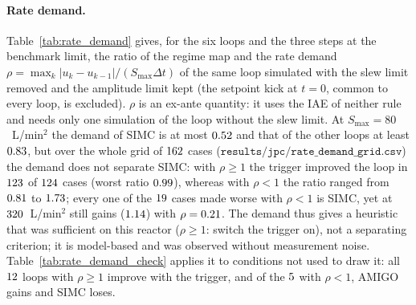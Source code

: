 \documentclass[11pt]{article}
\begin{document}




\paragraph{Rate demand.} Table~\ref{tab:rate_demand} gives, for the six loops and the three steps at the benchmark limit, the ratio of the regime map and the rate demand $\rho = \max_k|u_k - u_{k-1}|/(S_{\max}\Delta t)$ of the same loop simulated with the slew limit removed and the amplitude limit kept (the setpoint kick at $t = 0$, common to every loop, is excluded). $\rho$ is an ex-ante quantity: it uses the IAE of neither rule and needs only one simulation of the loop without the slew limit. At $S_{\max} = 80$~L/min$^2$ the demand of SIMC is at most $0.52$ and that of the other loops at least $0.83$, but over the whole grid of $162$ cases ($\texttt{results/jpc/rate\_demand\_grid.csv}$) the demand does not separate SIMC: with $\rho \ge 1$ the trigger improved the loop in $123$ of $124$ cases (worst ratio $0.99$), whereas with $\rho < 1$ the ratio ranged from $0.81$ to $1.73$; every one of the $19$ cases made worse with $\rho < 1$ is SIMC, yet \vrhohelplowloop{} at $320$~L/min$^2$ still gains ($1.14$) with $\rho = 0.21$. The demand thus gives a heuristic that was sufficient on this reactor ($\rho \ge 1$: switch the trigger on), not a separating criterion; it is model-based and was observed without measurement noise. Table~\ref{tab:rate_demand_check} applies it to conditions not used to draw it: all $12$ loops with $\rho \ge 1$ improve with the trigger, and of the $5$ with $\rho < 1$, AMIGO gains and SIMC loses.




\end{document}
